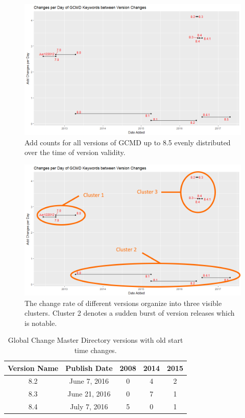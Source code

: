 \begin{figure}%
	\centering
	\includegraphics[scale=0.56]{figures/GCMDPlot1.png}
	\caption[Global Change Master Direcotry counts distributed over time.]{Add counts for all versions of GCMD up to 8.5 evenly distributed over the time of version validity.}
	\label{GCMDPlot1}
\end{figure}
\begin{figure}%
	\centering
	\includegraphics[scale=0.56]{figures/GCMDPlot1_Cluster.png}
	\caption[Global Change Master Directory count distributed over time with clusters marked.]{The change rate of different versions organize into three visible clusters. Cluster 2 denotes a sudden burst of version releases which is notable.}
	\label{GCMDPlot1Cluster}
\end{figure}
\begin{table}
	\caption{Global Change Master Directory versions with old start time changes.}
	\label{table:GCMD_old}
	\centering
	\begin{tabular}{|c|c|c|c|c|}
		\hline
		Version Name&	Publish Date&	2008&	2014&	2015\\ \hline
		8.2&	June 7, 2016&	0&	4&	2\\
		8.3&	June 21, 2016&	0&	7&	1\\
		8.4&	July 7, 2016&	5&	0&	1\\
		\hline
	\end{tabular}
\end{table}

